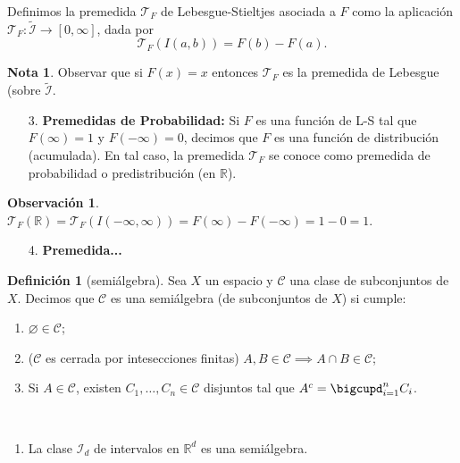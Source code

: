 \documentclass[11pt]{article}
\theoremstyle{definition} %
\newtheorem{definition}[theorem]{Definición}
\newtheorem{remark}[theorem]{Observación}
\newtheorem{note}[theorem]{Nota}
\newcommand{\R}{\mathbb{R}}
\begin{document}
\begin{property}
	\noindent Definimos la premedida $\mathcal{T}_F$ de Lebesgue-Stieltjes asociada a $F$ como la aplicación $\mathcal{T}_F: \widetilde{\mathcal{I}} \to [0, \infty]$, dada por
	\[ \mathcal{T}_F (I(a,b)) = F(b) - F(a) .\]

	\begin{note}
		Observar que si $F(x)=x$ entonces $\mathcal{T}_F$ es la premedida de Lebesgue (sobre $\widetilde{\mathcal{I}}$.
	\end{note}

	\begin{enumerate}
		\item[3.] \textbf{Premedidas de Probabilidad:} Si $F$ es una función de L-S tal que $F(\infty) = 1$ y $F(-\infty) = 0$, decimos que $F$ es una función de distribución (acumulada). En tal caso, la premedida $\mathcal{T}_F$ se conoce como premedida de probabilidad o predistribución (en $\R$).
	\end{enumerate}

	\begin{remark}
		$\mathcal{T}_F (\R) = \mathcal{T}_F (I(-\infty,\infty)) = F(\infty) - F(-\infty) = 1 - 0 = 1$.
	\end{remark}

	\begin{enumerate}
		\item[4.] \textbf{Premedida...}
	\end{enumerate}

  \begin{definition}[semiálgebra]
		Sea $X$ un espacio y $\mathscr{C}$ una clase de subconjuntos de $X$. Decimos que $\mathscr{C}$ es una semiálgebra (de subconjuntos de $X$) si cumple:
		\begin{enumerate}
			\item $\varnothing \in \mathscr{C}$;

			\item ($\mathscr{C}$ es cerrada por intesecciones finitas) $A,B\in\mathscr{C} \implies A \cap B \in \mathscr{C}$;
			
			\item Si $A \in \mathscr{C}$, existen $C_1,\dots,C_n \in \mathscr{C}$ disjuntos tal que $A^c = \displaystyle\bigcupd_{i=1}^{n} C_i$.
		\end{enumerate}
	\end{definition}
	
	\begin{eg}~
		\begin{enumerate}
			\item La clase $\mathcal{I}_d$ de intervalos en $\R^d$ es una semiálgebra.


\end{enumerate}
\end{eg}
\end{property}
\end{document}
